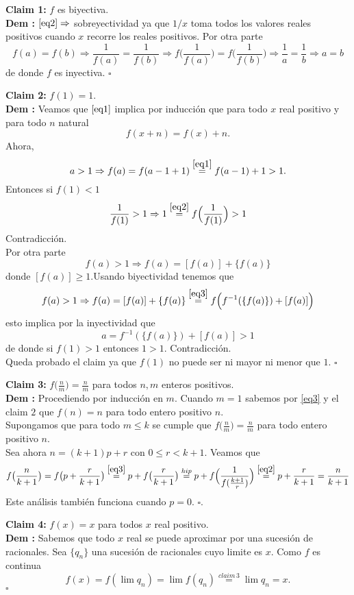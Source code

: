 \vspace{0.5cm}

\textbf{Claim 1:} $f$ es  biyectiva.\\
\textbf{Dem :} $\eqref{eq2}\Rightarrow$ sobreyectividad ya que $1/x$ toma todos los valores reales positivos cuando $x$ recorre los reales positivos.
Por otra parte 
\[
f(a) = f(b) \Rightarrow \frac{1}{f(a)} = \frac{1}{f(b)}\Rightarrow f\Big(\frac{1}{f(a)}\Big) = f\Big(\frac{1}{f(b)}\Big)\Rightarrow \frac{1}{a} = \frac{1}{b} \Rightarrow a=b
\]
de donde $f$ es inyectiva. $\square$

\vspace{0.5cm}

\textbf{Claim 2:} $f(1) = 1$.\\
\textbf{Dem :} Veamos que $\eqref{eq1}$ implica por inducción que para todo $x$ real positivo y para todo $n$ natural
\begin{equation}
\label{eq3}
f(x+n) = f(x)+n.
\end{equation}
Ahora,
\[
a>1\Rightarrow f(a) = f(a-1+1) \stackrel{\eqref{eq1}}{=}  f(a-1)+1 > 1.
\]
Entonces si $f(1)< 1$
\[
\frac{1}{f(1)} > 1 \Rightarrow 1 \stackrel{\eqref{eq2}}{=} f\Big(\frac{1}{f(1)}\Big) > 1 
\]
Contradicción.\\

Por otra parte 
\[
f(a) > 1\Rightarrow f(a) = [f(a)] + \{f(a)\}
\]
donde $[f(a)]\ge 1$.Usando biyectividad tenemos que 
\[
f(a) > 1\Rightarrow f(a) = [f(a)] + \{f(a)\} \stackrel{\eqref{eq3}}{=}f\Big( f^{-1}(\{f(a)\})+[f(a)]\Big)
\]
esto implica por la inyectividad que 
\[
a = f^{-1}(\{f(a)\})+[f(a)] > 1
\]
de donde si $f(1)>1$ entonces $1>1$. Contradicción.\\
Queda probado el claim ya que $f(1)$ no puede ser ni mayor ni menor que $1$. $\square$

\vspace{0.5cm}

\textbf{Claim 3:} $f\big(\frac{n}{m}\big) = \frac{n}{m}$ para todos $n,m$ enteros positivos.\\
\textbf{Dem :} Procediendo por inducción en $m$. Cuando $m=1$ sabemos por \eqref{eq3} y el claim $2$ que $f(n) = n$ para todo entero positivo $n$.\\
Supongamos que para todo $m \le k$ se cumple que $f\big(\frac{n}{m}\big) = \frac{n}{m}$ para todo entero positivo $n$.\\
Sea ahora $n = (k+1)p+r$ con $0\le r < k+1$. Veamos que
\[
f\big(\frac{n}{k+1}\big) = f\big(p + \frac{r}{k+1}\big) \stackrel{\eqref{eq3}}{=} p+f\big(\frac{r}{k+1}\big) \stackrel{hip}{=} p+ f\Big(\frac{1}{f(\frac{k+1}{r})}\Big)  \stackrel{\eqref{eq2}}{=} p + \frac{r}{k+1} = \frac{n}{k+1}
\]
Este análisis también funciona cuando $p = 0$. $\square$.

\vspace{0.5cm}
\textbf{Claim 4:} $f(x)= x$ para todos $x$ real positivo.\\
\textbf{Dem :} Sabemos que todo $x$ real se puede aproximar por una sucesión de racionales. Sea $\{q_n\}$ una sucesión de racionales cuyo limite es $x$. Como $f$ es continua
\[
f(x) = f(\lim q_n) = \lim f(q_n)\stackrel{claim\,3}{=} \lim q_n = x.
\]
$\square$
